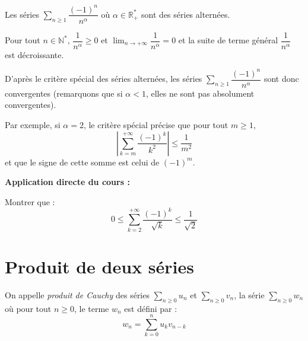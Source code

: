 \documentclass[french,11pt,twoside]{VcCours}
\newenvironment{ApplicationDirecte}{\textbf{Application directe du cours :}

}{}
\newcommand{\Sum}[2]{\ensuremath{\textstyle{\sum\limits_{#1}^{#2}}}}
\begin{document}
\newpage

$\phantom{}$

\vspace{7cm}

\begin{Exemple} Les séries $\Sum{n \geq 1}{} \dfrac{(-1)^n}{n^{\alpha}}$ où $\alpha \in \mathbb{R}_+^{*}$ sont des séries alternées.

Pour tout $n \in \mathbb{N}^*$, $\dfrac{1}{n^{\alpha}} \geq 0$ et $\lim_{n \rightarrow + \infty} \dfrac{1}{n^{\alpha}} = 0$ et la suite de terme général $\dfrac{1}{n^{\alpha}}$ est décroissante. 

D'après le critère spécial des séries alternées, les séries $\Sum{n \geq 1}{} \dfrac{(-1)^n}{n^{\alpha}}$ sont donc convergentes (remarquons que si $\alpha <1$, elles ne sont pas absolument convergentes).

\medskip

Par exemple, si $\alpha = 2$, le critère spécial précise que pour tout $m \geq 1$,
$$ \left\vert \sum_{k=m}^{+ \infty}\dfrac{(-1)^k}{k^{2}}  \right\vert \leq \frac{1}{m^2}$$
et que le signe de cette somme est celui de $(-1)^m$.
\end{Exemple}

\begin{ApplicationDirecte} Montrer que :
$$ 0 \leq \sum_{k=2}^{+ \infty}\dfrac{(-1)^k}{\sqrt{k}} \leq \frac{1}{\sqrt{2}}$$
\end{ApplicationDirecte}


\section{Produit de deux séries}

\begin{Definition}{} On appelle \emph{produit de Cauchy} des séries $\Sum{n \geq 0}{} u_n$ et $\Sum{n \geq 0}{} v_n$, la série $\Sum{n \geq 0}{} w_n$ où pour tout $n \geq 0$, le terme $w_n$ est défini par :
$$w_n = \sum_{k=0}^n u_k v_{n-k}$$
\end{Definition}
\end{document}
